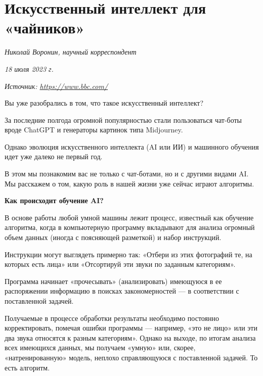 
\section{Искусственный интеллект для «чайников»}

\textit{Николай Воронин, научный корреспондент}

\textit{18 июля 2023 г.}

\textit{Источник: \url{https://www.bbc.com/}}




Вы уже разобрались в том, что такое искусственный интеллект?

За последние полгода огромной популярностью стали пользоваться чат-боты вроде ChatGPT и генераторы картинок типа Midjourney.

Однако эволюция искусственного интеллекта (AI или ИИ) и машинного обучения идет уже далеко не первый год.

В этом  мы познакомим вас не только с чат-ботами, но и с другими видами AI. Мы расскажем о том, какую роль в нашей жизни уже сейчас играют алгоритмы.

\textbf{Как происходит обучение AI?}

В основе работы любой умной машины лежит процесс, известный как обучение алгоритма, когда в компьютерную программу вкладывают для анализа огромный объем данных (иногда с поясняющей разметкой) и набор инструкций.

Инструкции могут выглядеть примерно так: «Отбери из этих фотографий те, на которых есть лица» или «Отсортируй эти звуки по заданным категориям».

Программа начинает «прочесывать» (анализировать) имеющуюся в ее распоряжении информацию в поисках закономерностей — в соответствии с поставленной задачей.

Получаемые в процессе обработки результаты необходимо постоянно корректировать, помечая ошибки программы --- например, «это не лицо» или эти два звука относятся к разным категориям». Однако на выходе, по итогам анализа всех имеющихся данных, мы получаем «умную» или, скорее, «натренированную» модель, неплохо справляющуюся с поставленной задачей. То есть алгоритм.

